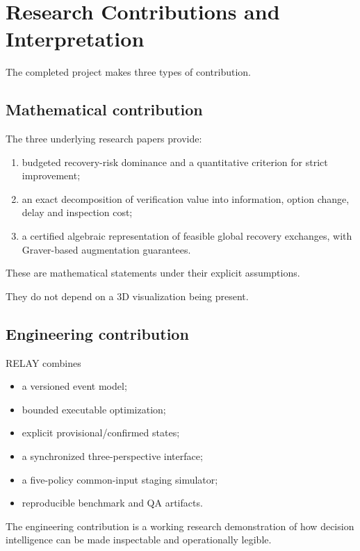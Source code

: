 \documentclass[10pt,a4paper]{article}
\theoremstyle{plain}
\theoremstyle{definition}
\theoremstyle{remark}
\begin{document}
\section{Research Contributions and Interpretation}

The completed project makes
three types of contribution.

\subsection{Mathematical contribution}

The three underlying research papers
provide:

\begin{enumerate}[
  label=(\roman*),
  leftmargin=18pt,
  itemsep=3pt
]
\item
budgeted recovery-risk dominance
and a quantitative criterion
for strict improvement;
\item
an exact decomposition of
verification value into
information, option change,
delay and inspection cost;
\item
a certified algebraic representation
of feasible global recovery exchanges,
with Graver-based augmentation guarantees.
\end{enumerate}

These are mathematical statements
under their explicit assumptions.

They do not depend on a
3D visualization being present.

\subsection{Engineering contribution}

RELAY combines

\begin{itemize}[leftmargin=18pt,itemsep=2pt]
\item a versioned event model;
\item bounded executable optimization;
\item explicit provisional/confirmed states;
\item a synchronized three-perspective interface;
\item a five-policy common-input staging simulator;
\item reproducible benchmark and QA artifacts.
\end{itemize}

The engineering contribution is
a working research demonstration
of how decision intelligence can be
made inspectable and operationally legible.
\end{document}
